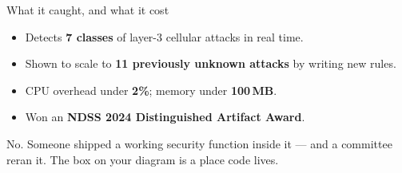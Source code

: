 \begin{frame}{What it caught, and what it cost}
  \vspace{0.4em}
  \small
  \begin{itemize}\itemsep6pt
    \item Detects \textbf{7 classes} of layer-3 cellular attacks in real time.
    \item Shown to scale to \textbf{11 previously unknown attacks} by writing new rules.
    \item CPU overhead under \textbf{2\%}; memory under \textbf{100\,MB}.
    \item Won an \textbf{NDSS 2024 Distinguished Artifact Award}.
  \end{itemize}

  \vspace{0.6em}
     {No. Someone shipped a working security function inside it --- and a
      committee reran it. The box on your diagram is a place code lives.}
\end{frame}




